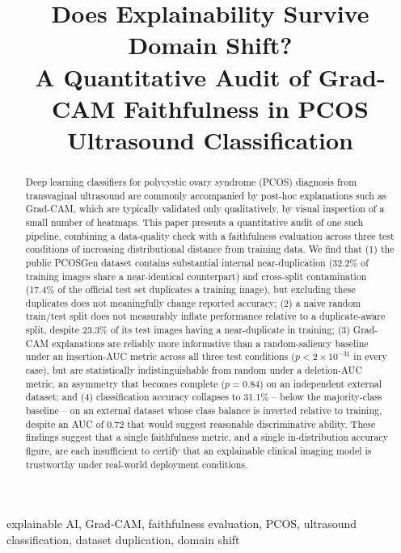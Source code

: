 \documentclass[conference]{IEEEtran}
\begin{document}
\title{Does Explainability Survive Domain Shift?\\
A Quantitative Audit of Grad-CAM Faithfulness in PCOS Ultrasound Classification}

\author{
}

\maketitle

\begin{abstract}
Deep learning classifiers for polycystic ovary syndrome (PCOS) diagnosis from transvaginal ultrasound are commonly accompanied by post-hoc explanations such as Grad-CAM, which are typically validated only qualitatively, by visual inspection of a small number of heatmaps. This paper presents a quantitative audit of one such pipeline, combining a data-quality check with a faithfulness evaluation across three test conditions of increasing distributional distance from training data. We find that (1) the public PCOSGen dataset contains substantial internal near-duplication (32.2\% of training images share a near-identical counterpart) and cross-split contamination (17.4\% of the official test set duplicates a training image), but excluding these duplicates does not meaningfully change reported accuracy; (2) a naive random train/test split does not measurably inflate performance relative to a duplicate-aware split, despite 23.3\% of its test images having a near-duplicate in training; (3) Grad-CAM explanations are reliably more informative than a random-saliency baseline under an insertion-AUC metric across all three test conditions ($p < 2 \times 10^{-31}$ in every case), but are statistically indistinguishable from random under a deletion-AUC metric, an asymmetry that becomes complete ($p = 0.84$) on an independent external dataset; and (4) classification accuracy collapses to 31.1\% -- below the majority-class baseline -- on an external dataset whose class balance is inverted relative to training, despite an AUC of 0.72 that would suggest reasonable discriminative ability. These findings suggest that a single faithfulness metric, and a single in-distribution accuracy figure, are each insufficient to certify that an explainable clinical imaging model is trustworthy under real-world deployment conditions.
\end{abstract}

\begin{IEEEkeywords}
explainable AI, Grad-CAM, faithfulness evaluation, PCOS, ultrasound classification, dataset duplication, domain shift
\end{IEEEkeywords}
\end{document}
